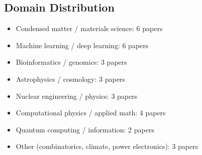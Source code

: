 \documentclass[11pt,a4paper]{article}
\begin{document}
\subsection{Domain Distribution}
\begin{itemize}[nosep]
  \item Condensed matter / materials science: 6 papers
  \item Machine learning / deep learning: 6 papers
  \item Bioinformatics / genomics: 3 papers
  \item Astrophysics / cosmology: 3 papers
  \item Nuclear engineering / physics: 3 papers
  \item Computational physics / applied math: 4 papers
  \item Quantum computing / information: 2 papers
  \item Other (combinatorics, climate, power electronics): 3 papers
\end{itemize}
\end{document}

